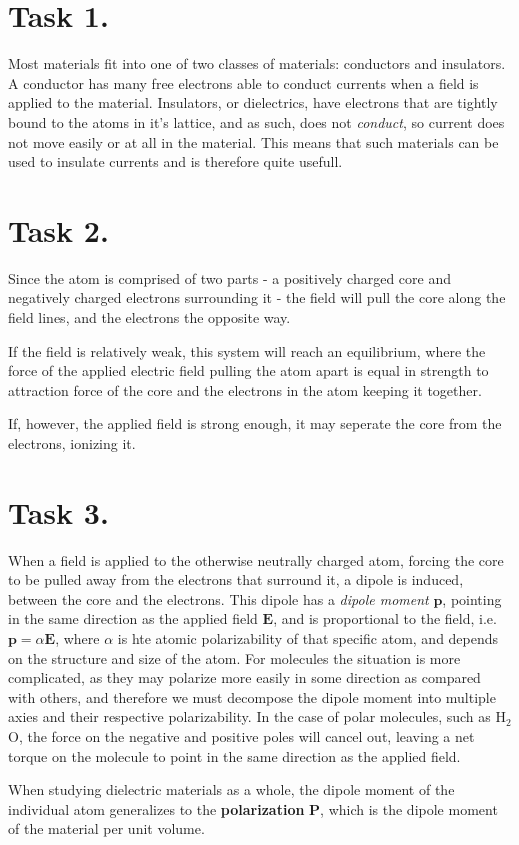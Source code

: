 \documentclass[a4paper,11pt]{article}
\begin{document}


\section*{Task 1.}
Most materials fit into one of two classes of materials: conductors and insulators. A conductor has
many free electrons able to conduct currents when a field is applied to the material. Insulators, or 
dielectrics, have electrons that are tightly bound to the atoms in it's lattice, and as such, does not 
\textit{conduct}, so current does not move easily or at all in the material. This means that such materials 
can be used to insulate currents and is therefore quite usefull.

\section*{Task 2.}
Since the atom is comprised of two parts - a positively charged core and negatively charged electrons surrounding it - the field will pull the 
core along the field lines, and the electrons the opposite way.
\begin{alphalist}
    \item If the field is relatively weak, this system will reach an equilibrium, where the force of the applied electric field pulling the atom apart is
        equal in strength to attraction force of the core and the electrons in the atom keeping it together.
    \item If, however, the applied field is strong enough, it may seperate the core from the electrons, ionizing it.
\end{alphalist}

\section*{Task 3.}
\begin{alphalist}
    \item When a field is applied to the otherwise neutrally charged atom, forcing the core to be pulled away from the electrons that surround it, a dipole is induced,
        between the core and the electrons. This dipole has a \textit{dipole moment} $\mathbf{p}$, pointing in the same direction as the applied field $\mathbf{E}$,
        and is proportional to the field, i.e. $\mathbf{p} = \alpha \mathbf{E}$, where $\alpha$ is hte atomic polarizability of that specific atom, and depends on the structure 
        and size of the atom. For molecules the situation is more complicated, as they may polarize more easily in some direction as compared with others, and therefore 
        we must decompose the dipole moment into multiple axies and their respective polarizability. In the case of polar molecules, such as H$_2$O, the force on the negative 
        and positive poles will cancel out, leaving a net torque on the molecule to point in the same direction as the applied field.
    \item When studying dielectric materials as a whole, the dipole moment of the individual atom generalizes to the \textbf{polarization} $\mathbf{P}$,
        which is the dipole moment of the material per unit volume.
\end{alphalist}
\end{document}

